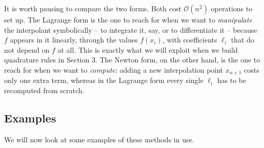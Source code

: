 It is worth pausing to compare the two forms. Both cost $\mathcal{O}(n^2)$ operations to set up. The Lagrange form is the one to reach for when we want to \emph{manipulate} the interpolant symbolically -- to integrate it, say, or to differentiate it -- because $f$ appears in it linearly, through the values $f(x_i)$, with coefficients $\ell_i$ that do not depend on $f$ at all. This is exactly what we will exploit when we build quadrature rules in Section 3. The Newton form, on the other hand, is the one to reach for when we want to \emph{compute}: adding a new interpolation point $x_{n+1}$ costs only one extra term, whereas in the Lagrange form every single $\ell_i$ has to be recomputed from scratch.

\subsection{Examples}

We will now look at some examples of these methods in use.

